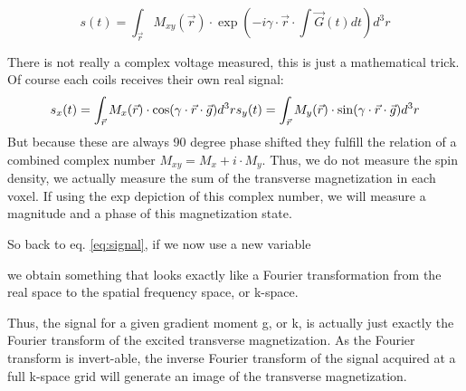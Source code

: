 \documentclass[a4paper,12pt]{extarticle}
\begin{document}
 \begin{equation} \label{eq:signal}
     s(t) = \int_{\vec{r}}M_{xy}(\vec{r})\cdot \exp\left(-i\gamma\cdot \vec{r}\cdot \int \vec{G}(t)dt\right) d^3r
 \end{equation}
 
There is not really a complex voltage measured, this is just a mathematical trick. Of course each coils receives their own real signal:   
\begin{equation}
 s_x(t) = \int_{\vec{r}} M_{x}(\vec{r})\cdot \cos(\gamma\cdot\vec{r}\cdot \vec{g}) d^3r \\
 s_y(t) = \int_{\vec{r}} M_{y}(\vec{r})\cdot \sin(\gamma\cdot \vec{r}\cdot \vec{g}) d^3r \\
 \end{equation}
 But because these are always 90 degree phase shifted they fulfill the relation of a combined complex number $M_{xy}=M_x+i\cdot M_y$. Thus, we do not measure the spin density, we actually measure the sum of the transverse magnetization in each voxel. If using the exp depiction of this complex number, we will measure a magnitude and a phase of this magnetization state.
 
So back to eq. \eqref{eq:signal}, if we now use a new variable 

we obtain something that looks exactly like a Fourier transformation from the real space to the spatial frequency space, or k-space.

Thus, the signal for a given gradient moment g, or k, is  actually just exactly the Fourier transform of the  excited transverse magnetization. 
 As the Fourier transform is invert-able, the inverse Fourier transform of the signal acquired at a full k-space grid will generate an image of the transverse magnetization.
 
\end{document}
